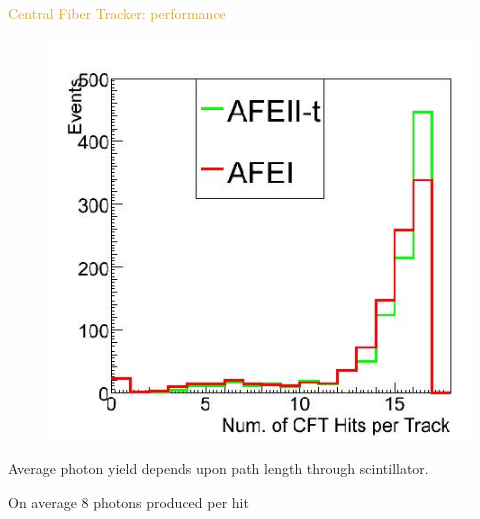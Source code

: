 \begin{frame}{\textcolor{Goldenrod}{Central Fiber Tracker: performance}}
\begin{overlayarea}{\textwidth}{\textheight}
\begin{figure}[h]
      \includegraphics[height=0.3\textheight]{./Images/24_CFT_performance}
    \end{figure}
    \itt[<+->]
  \item Average photon yield depends upon path length through
    scintillator.
  \item On average 8 photons produced per hit
    \tti
 \end{overlayarea}
\end{frame}

      
    
    
    
    
